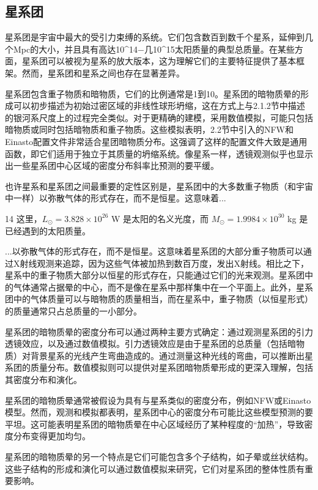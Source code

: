 \subsection{星系团}

星系团是宇宙中最大的受引力束缚的系统。它们包含数百到数千个星系，延伸到几个Mpc的大小，并且具有高达10^14−几10^15太阳质量的典型总质量。在某些方面，星系团可以被视为星系的放大版本，这为理解它们的主要特征提供了基本框架。然而，星系团和星系之间也存在显著差异。

星系团包含重子物质和暗物质，它们的比例通常是1到10。星系团的暗物质晕的形成可以初步描述为初始过密区域的非线性球形坍缩，这在方式上与2.1.2节中描述的银河系尺度上的过程完全类似。对于更精确的建模，采用数值模拟，可能只包括暗物质或同时包括暗物质和重子物质。这些模拟表明，2.2节中引入的NFW和Einasto配置文件非常适合星团暗物质分布。这强调了这样的配置文件大致是通用函数，即它们适用于独立于其质量的坍缩系统。像星系一样，透镜观测似乎也显示出一些星系团中心区域的密度分布斜率比预测的要平缓。

也许星系和星系团之间最重要的定性区别是，星系团中的大多数重子物质（和宇宙中一样）以弥散气体的形式存在，而不是恒星。这意味着...

14 这里，\( L_\odot = 3.828 \times 10^{26} \) W 是太阳的名义光度，而 \( M_\odot = 1.9984 \times 10^{30} \) kg 是已经遇到的太阳质量。

...以弥散气体的形式存在，而不是恒星。这意味着星系团的大部分重子物质可以通过X射线观测来追踪，因为这些气体被加热到数百万度，发出X射线。相比之下，星系中的重子物质大部分以恒星的形式存在，只能通过它们的光来观测。星系团中的气体通常占据晕的中心，而不是像在星系中那样集中在一个平面上。此外，星系团中的气体质量可以与暗物质的质量相当，而在星系中，重子物质（以恒星形式）的质量通常只占总质量的一小部分。

星系团的暗物质晕的密度分布可以通过两种主要方式确定：通过观测星系团的引力透镜效应，以及通过数值模拟。引力透镜效应是由于星系团的总质量（包括暗物质）对背景星系的光线产生弯曲造成的。通过测量这种光线的弯曲，可以推断出星系团的质量分布。数值模拟则可以提供对星系团暗物质晕形成的更深入理解，包括其密度分布和演化。

星系团的暗物质晕通常被假设为具有与星系类似的密度分布，例如NFW或Einasto模型。然而，观测和模拟都表明，星系团中心的密度分布可能比这些模型预测的要平坦。这可能表明星系团的暗物质晕在中心区域经历了某种程度的“加热”，导致密度分布变得更加均匀。

星系团的暗物质晕的另一个特点是它们可能包含多个子结构，如子晕或丝状结构。这些子结构的形成和演化可以通过数值模拟来研究，它们对星系团的整体性质有重要影响。

